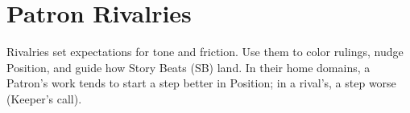 





















\section{Patron Rivalries}
\label{sec:patron-rivalries}

Rivalries set expectations for tone and friction. Use them to color rulings, nudge Position, and guide how Story Beats (SB) land. In their home domains, a Patron’s work tends to start a step better in Position; in a rival’s, a step worse (Keeper’s call).

